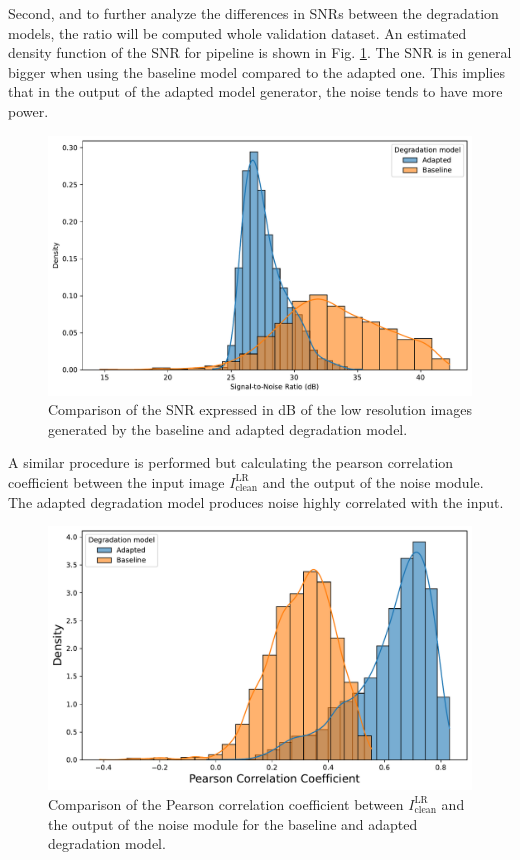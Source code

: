        Second, and to further analyze the differences in SNRs between the degradation models, the ratio will be computed whole validation dataset.
        An estimated density function of the SNR for pipeline is shown in Fig. \ref{fig:5-source-noise-SNR}.
        The SNR is in general bigger when using the baseline model compared to the adapted one.
        This implies that in the output of the adapted model generator, the noise tends to have more power. 

        \begin{figure}[H]
            \centering
            \includegraphics[width=\textwidth]{Includes/5-source-noise-SNR.pdf}
            \caption{Comparison of the SNR expressed in dB of the low resolution images generated by the baseline and adapted degradation model.}
            \label{fig:5-source-noise-SNR}
        \end{figure}


        A similar procedure is performed but calculating the pearson correlation coefficient between the input image $I^{\text{LR}}_{\text{clean}}$ and the output of the noise module. The adapted degradation model produces noise highly correlated with the input.


        \begin{figure}[H]
            \centering
            \includegraphics[width=\textwidth]{Includes/5-source-noise-correlation.pdf}
            \caption{Comparison of the Pearson correlation coefficient between $I^{\text{LR}}_{\text{clean}}$ and the output of the noise module for the baseline and adapted degradation model.}
            \label{fig:5-source-noise-correlation}
        \end{figure}

